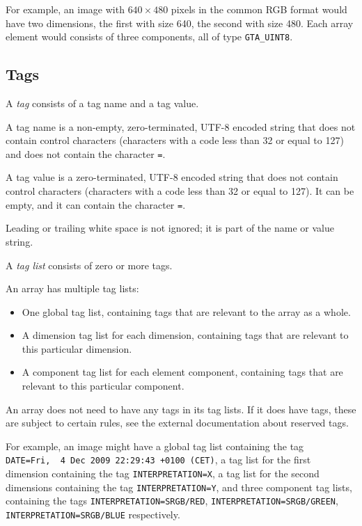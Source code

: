 \documentclass[a4paper,11pt]{article}
\newcommand{\code}[1]{\texttt{#1}}
\begin{document}
For example, an image with $640\times 480$ pixels in the common RGB format
would have two dimensions, the first with size 640, the second with size 480.
Each array element would consists of three components, all of type
\code{GTA\_UINT8}.


\subsection{Tags}
\label{sec:tags}

A \emph{tag} consists of a tag name and a tag value.

A tag name is a non-empty, zero-terminated, \mbox{UTF-8} encoded string that does not
contain control characters (characters with a code less than 32 or equal to 127)
and does not contain the character \code{=}.

A tag value is a zero-terminated, \mbox{UTF-8} encoded string that does not contain
control characters (characters with a code less than 32 or equal to 127). It can
be empty, and it can contain the character \code{=}.

Leading or trailing white space is not ignored; it is part of the name or
value string.

A \emph{tag list} consists of zero or more tags.

An array has multiple tag lists:
\begin{itemize}
\item One global tag list, containing tags that are relevant to the array as a
whole.
\item A dimension tag list for each dimension, containing tags that are
relevant to this particular dimension.
\item A component tag list for each element component, containing tags that
are relevant to this particular component.
\end{itemize}

An array does not need to have any tags in its tag lists. If it does have
tags, these are subject to certain rules, see the external documentation about
reserved tags.

For example, an image might have a global tag list containing the tag
\mbox{\code{DATE=Fri,~~4 Dec 2009 22:29:43 +0100 (CET)}}, 
a tag list for the first dimension containing the tag \code{INTERPRETATION=X},
a tag list for the second dimensions containing the tag
\code{INTERPRETATION=Y}, and three component tag lists, containing the tags
\code{INTERPRETATION=SRGB/RED}, \code{INTERPRETATION=SRGB/GREEN},
\code{INTERPRETATION=SRGB/BLUE} respectively.
\end{document}

